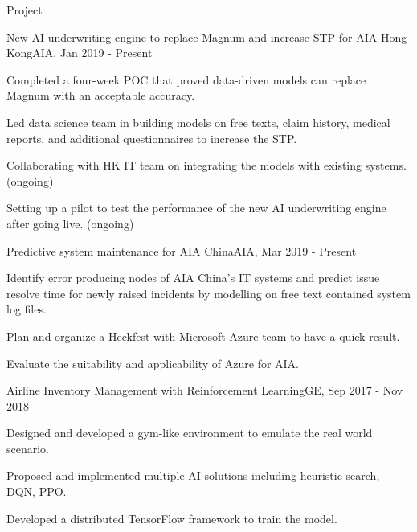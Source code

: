 \documentclass{resume} %
\begin{document}
\begin{rSection}{Project}

\begin{rSubsection}{New AI underwriting engine to replace Magnum and increase STP for AIA Hong Kong}{}{AIA, Jan 2019 - Present}{}
\item Completed a four-week POC that proved data-driven models can replace Magnum with an acceptable accuracy.
\item Led data science team in building models on free texts, claim history, medical reports, and additional questionnaires to increase the STP.  
\item Collaborating with HK IT team on integrating the models with existing systems. (ongoing)
\item Setting up a pilot to test the performance of the new AI underwriting engine after going live. (ongoing)
\end{rSubsection}


\begin{rSubsection}{Predictive system maintenance for AIA China}{}{AIA, Mar 2019 - Present}{}
\item Identify error producing nodes of AIA China's IT systems and predict issue resolve time for newly raised incidents by modelling on free text contained system log files.
\item Plan and organize a Heckfest with Microsoft Azure team to have a quick result.
\item Evaluate the suitability and applicability of Azure for AIA. 
\end{rSubsection}


\begin{rSubsection}{Airline Inventory Management with Reinforcement Learning}{}{GE, Sep 2017 - Nov 2018}{}
\item Designed and developed a gym-like environment to emulate the real world scenario.
\item Proposed and implemented multiple AI solutions including heuristic search, DQN, PPO.
\item Developed a distributed TensorFlow framework to train the model.
\end{rSubsection}



\end{rSection}
\end{document}
